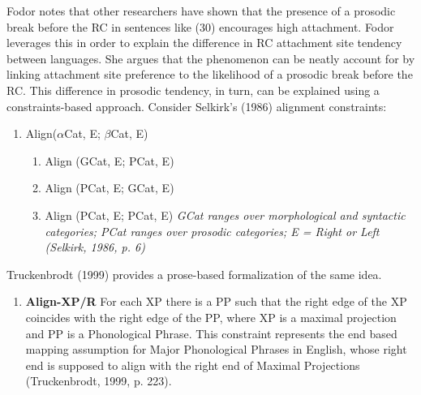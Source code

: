 \documentclass[12pt,oneside]{book}
\providecommand{\tightlist}{%
  \setlength{\itemsep}{0pt}\setlength{\parskip}{0pt}}
\begin{document}
Fodor notes that other researchers have shown  that the presence of a prosodic break before the RC in sentences like (30) encourages high attachment. Fodor leverages this in order to explain the difference in RC attachment site tendency between languages. She argues that the phenomenon can be neatly account for by linking attachment site preference to the likelihood of a prosodic break before the RC. This difference in prosodic tendency, in turn, can be explained using a constraints-based approach. Consider Selkirk's (1986) alignment constraints:

\begin{enumerate}
\def\labelenumi{(\arabic{enumi})}
\setcounter{enumi}{30}
\tightlist
\item
  Align(\(\alpha\)Cat, E; \(\beta\)Cat, E)

  \begin{enumerate}
  \def\labelenumii{\alph{enumii}.}
  \tightlist
  \item
    Align (GCat, E; PCat, E)
  \item
    Align (PCat, E; GCat, E)
  \item
    Align (PCat, E; PCat, E)
    \emph{GCat ranges over morphological and syntactic categories; PCat ranges over prosodic categories; E = Right or Left (Selkirk, 1986, p. 6)}
  \end{enumerate}
\end{enumerate}

Truckenbrodt (1999) provides a prose-based formalization of the same idea. 

\begin{enumerate}
\def\labelenumi{(\arabic{enumi})}
\setcounter{enumi}{31}
\tightlist
\item
  \textbf{Align-XP/R} \linebreak
  For each XP there is a PP such that the right edge of the XP coincides with the right edge of the PP, where XP is a maximal projection and PP is a Phonological Phrase. This constraint represents the end based mapping assumption for Major Phonological Phrases in English, whose right end is supposed to align with the right end of Maximal Projections (Truckenbrodt, 1999, p. 223).
\end{enumerate}
\end{document}
